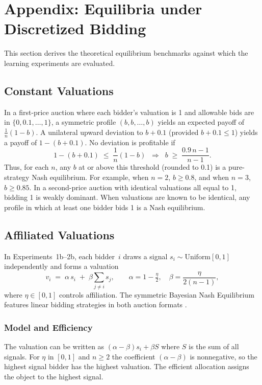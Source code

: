 
\section{Appendix: Equilibria under Discretized Bidding}
\label{sec:equilibria}

This section derives the theoretical equilibrium benchmarks against which the learning experiments are evaluated.

\subsection{Constant Valuations}

In a first-price auction where each bidder's valuation is 1 and allowable bids are in \(\{0,0.1,\dots,1\}\), a symmetric profile \((b,b,\dots,b)\) yields an expected payoff of \(\frac{1}{n}(1-b)\). A unilateral upward deviation to \(b+0.1\) (provided \(b+0.1 \le 1\)) yields a payoff of \(1-(b+0.1)\). No deviation is profitable if 
\[
1 - (b + 0.1) \;\le\; \frac{1}{n}(1 - b)
\;\;\Longrightarrow\;\;
b \;\ge\; \frac{0.9\,n - 1}{n - 1}.
\]
Thus, for each \(n\), any \(b\) at or above this threshold (rounded to 0.1) is a pure-strategy Nash equilibrium. For example, when \(n=2\), \(b\ge 0.8\), and when \(n=3\), \(b\ge 0.85\). In a second-price auction with identical valuations all equal to 1, bidding 1 is weakly dominant. When valuations are known to be identical, any profile in which at least one bidder bids 1 is a Nash equilibrium.

\subsection{Affiliated Valuations}

In Experiments~1b--2b, each bidder~$i$ draws a signal $s_i \sim \text{Uniform}[0,1]$ independently and forms a valuation
\[
v_i \;=\; \alpha\, s_i \;+\; \beta \sum_{j \neq i} s_j,
\qquad
\alpha = 1 - \tfrac{\eta}{2},
\quad
\beta = \frac{\eta}{2(n-1)},
\]
where $\eta \in [0,1]$ controls affiliation. The symmetric Bayesian Nash Equilibrium features linear bidding strategies in both auction formats \citep{MilgromWeber1982}.

\subsubsection{Model and Efficiency}

The valuation can be written as $(\alpha-\beta) s_i + \beta S$ where $S$ is the sum of all signals. For $\eta$ in $[0,1]$ and $n\ge2$ the coefficient $(\alpha-\beta)$ is nonnegative, so the highest signal bidder has the highest valuation. The efficient allocation assigns the object to the highest signal.

